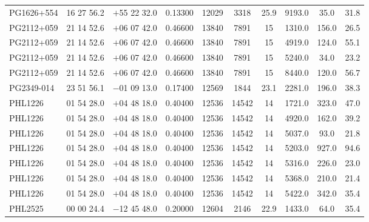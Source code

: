 \begin{landscape}
\begin{center}
\begin{longtable}{l c c c c c c c c c}
PG1626+554  &              16 27 56.2  &         $+$55 22 32.0  &       0.13300  & 12029  &   3318  &       25.9  &      9193.0  &  35.0  &   31.8  \\
PG2112+059  &              21 14 52.6  &         $+$06 07 42.0  &       0.46600  & 13840  &   7891  &       15  &        1310.0  &  156.0  &  26.5  \\
PG2112+059  &              21 14 52.6  &         $+$06 07 42.0  &       0.46600  & 13840  &   7891  &       15  &        4919.0  &  124.0  &  55.1  \\
PG2112+059  &              21 14 52.6  &         $+$06 07 42.0  &       0.46600  & 13840  &   7891  &       15  &        5240.0  &  34.0  &   23.2  \\
PG2112+059  &              21 14 52.6  &         $+$06 07 42.0  &       0.46600  & 13840  &   7891  &       15  &        8440.0  &  120.0  &  56.7  \\
PG2349-014  &              23 51 56.1  &         $-$01 09 13.0  &       0.17400  & 12569  &   1844  &       23.1  &      2281.0  &  196.0  &  38.3  \\
PHL1226  &                 01 54 28.0  &         $+$04 48 18.0  &       0.40400  & 12536  &   14542  &      14  &        1721.0  &  323.0  &  47.0  \\
PHL1226  &                 01 54 28.0  &         $+$04 48 18.0  &       0.40400  & 12536  &   14542  &      14  &        4920.0  &  162.0  &  39.2  \\
PHL1226  &                 01 54 28.0  &         $+$04 48 18.0  &       0.40400  & 12536  &   14542  &      14  &        5037.0  &  93.0  &   21.8  \\
PHL1226  &                 01 54 28.0  &         $+$04 48 18.0  &       0.40400  & 12536  &   14542  &      14  &        5203.0  &  927.0  &  94.6  \\
PHL1226  &                 01 54 28.0  &         $+$04 48 18.0  &       0.40400  & 12536  &   14542  &      14  &        5316.0  &  226.0  &  23.0  \\
PHL1226  &                 01 54 28.0  &         $+$04 48 18.0  &       0.40400  & 12536  &   14542  &      14  &        5368.0  &  210.0  &  21.4  \\
PHL1226  &                 01 54 28.0  &         $+$04 48 18.0  &       0.40400  & 12536  &   14542  &      14  &        5422.0  &  342.0  &  35.4  \\
PHL2525  &                 00 00 24.4  &         $-$12 45 48.0  &       0.20000  & 12604  &   2146  &       22.9  &      1433.0  &  64.0  &   35.4  \\

\end{longtable}
\end{center}
\end{landscape}
